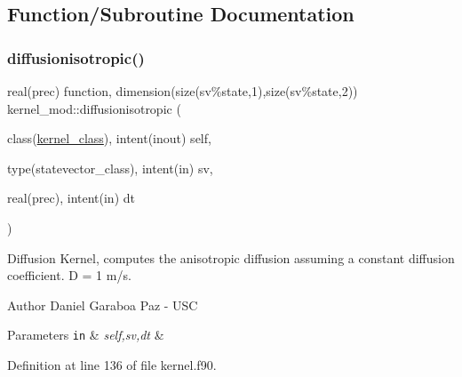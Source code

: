 \subsection{Function/\+Subroutine Documentation}
\mbox{\label{namespacekernel__mod_a92805ef71e30527b27de4efd7561f8f7}} 
\subsubsection{\texorpdfstring{diffusionisotropic()}{diffusionisotropic()}}
{\footnotesize\ttfamily real(prec) function, dimension(size(sv\%state,1),size(sv\%state,2)) kernel\+\_\+mod\+::diffusionisotropic (\begin{DoxyParamCaption}\item[{class(\mbox{\hyperlink{structkernel__mod_1_1kernel__class}{kernel\+\_\+class}}), intent(inout)}]{self,  }\item[{type(statevector\+\_\+class), intent(in)}]{sv,  }\item[{real(prec), intent(in)}]{dt }\end{DoxyParamCaption})}



Diffusion Kernel, computes the anisotropic diffusion assuming a constant diffusion coefficient. D = 1 m/s. 

\begin{DoxyAuthor}{Author}
Daniel Garaboa Paz -\/ U\+SC 
\end{DoxyAuthor}

\begin{DoxyParams}[1]{Parameters}
\mbox{\tt in}  & {\em self,sv,dt} & \\
\hline
\end{DoxyParams}


Definition at line 136 of file kernel.\+f90.


